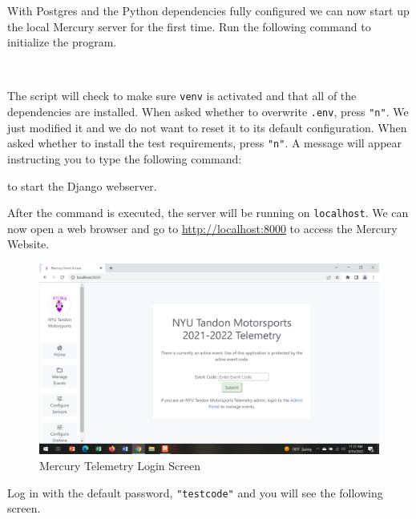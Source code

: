 \documentclass[12pt, letterpaper]{article}
\begin{document}
{{{{{{{\par With Postgres and the Python dependencies fully configured we can now start up the local Mercury server for the first time. Run the following command to initialize the program. \\[0.25\baselineskip]

\par{} \\[0.25\baselineskip]

\par The script will check to make sure \texttt{venv} is activated and that all of the dependencies are installed. When asked whether to overwrite \texttt{.env}, press \texttt{"n"}. We just modified it and we do not want to reset it to its default configuration. When asked whether to install the test requirements, press \texttt{"n"}. A message will appear instructing you to type the following command: \\[0.25\baselineskip]

\par{ to start the Django webserver. \\[0.25\baselineskip]

\par After the command is executed, the server will be running on \texttt{localhost}. We can now open a web browser and go to \url{http://localhost:8000} to access the Mercury Website.

\begin{figure}[h!]
	\centering
	\includegraphics[width=1\columnwidth]{assets/login.png}
	\caption{Mercury Telemetry Login Screen}
	\end{figure}	

\par Log in with the default password, \texttt{"testcode"} and you will see the following screen.

}}}}}}}}
\end{document}
